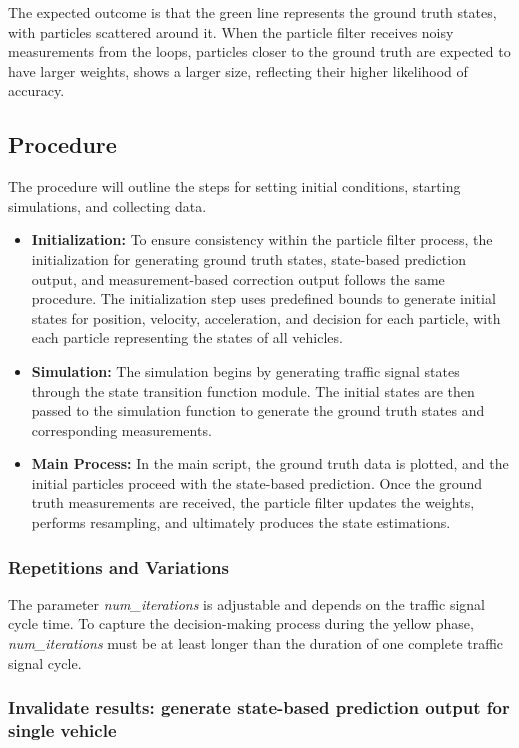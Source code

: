 The expected outcome is that the green line represents the ground truth states, with particles scattered around it. When the particle filter receives noisy measurements from the loops, particles closer to the ground truth are expected to have larger weights, shows a larger size, reflecting their higher likelihood of accuracy.

\subsection{Procedure}
The procedure will outline the steps for setting initial conditions, starting simulations, and collecting data.
\begin{itemize}
    \item \textbf{Initialization:} To ensure consistency within the particle filter process, the initialization for generating ground truth states, state-based prediction output, and measurement-based correction output follows the same procedure. The initialization step uses predefined bounds to generate initial states for position, velocity, acceleration, and decision for each particle, with each particle representing the states of all vehicles.
    \item \textbf{Simulation:} The simulation begins by generating traffic signal states through the state transition function module. The initial states are then passed to the simulation function to generate the ground truth states and corresponding measurements.
    \item \textbf{Main Process:} In the main script, the ground truth data is plotted, and the initial particles proceed with the state-based prediction. Once the ground truth measurements are received, the particle filter updates the weights, performs resampling, and ultimately produces the state estimations.
\end{itemize}

\subsubsection{Repetitions and Variations}
The parameter \textit{num\_iterations} is adjustable and depends on the traffic signal cycle time. To capture the decision-making process during the yellow phase, \textit{num\_iterations} must be at least longer than the duration of one complete traffic signal cycle.




\subsubsection{Invalidate results: generate state-based prediction output for single vehicle}

